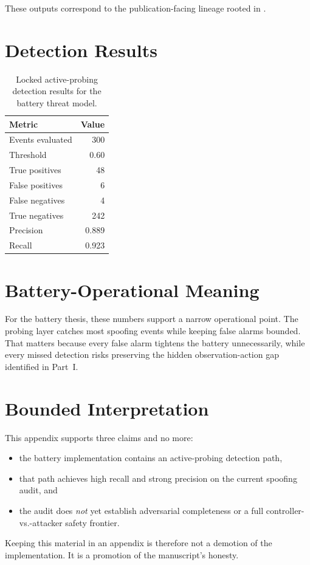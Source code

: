 These outputs correspond to the publication-facing lineage rooted in
.

\section{Detection Results}

\begin{table}[ht]
\centering
\caption{Locked active-probing detection results for the battery threat
model.}
\label{tab:active-probing-results}
\begin{tabular}{lr}
\toprule
\textbf{Metric} & \textbf{Value} \\
\midrule
Events evaluated & 300 \\
Threshold & 0.60 \\
True positives & 48 \\
False positives & 6 \\
False negatives & 4 \\
True negatives & 242 \\
Precision & 0.889 \\
Recall & 0.923 \\
\bottomrule
\end{tabular}
\end{table}

\section{Battery-Operational Meaning}

For the battery thesis, these numbers support a narrow operational point.
The probing layer catches most spoofing events while keeping false alarms
bounded.  That matters because every false alarm tightens the battery
unnecessarily, while every missed detection risks preserving the hidden
observation-action gap identified in Part~I.

\section{Bounded Interpretation}

This appendix supports three claims and no more:

\begin{itemize}
  \item the battery implementation contains an active-probing detection path,
  \item that path achieves high recall and strong precision on the current
    spoofing audit, and
  \item the audit does \emph{not} yet establish adversarial completeness or a
    full controller-vs.-attacker safety frontier.
\end{itemize}

Keeping this material in an appendix is therefore not a demotion of the
implementation.  It is a promotion of the manuscript's honesty.
